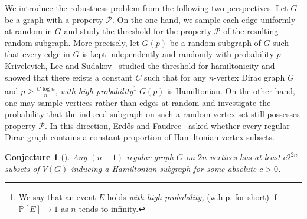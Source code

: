 \documentclass[11pt, a4paper]{article}
\newtheorem{conjecture}[theorem]{Conjecture}
\theoremstyle{definition}
\newcommand{\<}{\subseteq}
\begin{document}

We introduce the robustness problem from the following two perspectives. 
Let $G$ be a graph with a property $\mathcal{P}$.
On the one hand, we sample each edge uniformly at random in $G$ and study the threshold for the property $\mathcal{P}$ of the resulting random subgraph. 
{More precisely, let $G(p)$ be a random subgraph of $G$ such that every edge in $G$ is kept independently and randomly with probability $p$.} 
Krivelevich, Lee and Sudakov~\cite{Krivelevich2014} studied the threshold for hamiltonicity and showed that there exists a constant $C$ such that for any $n$-vertex Dirac graph $G$ and $p\ge \frac{C\log n}{n}$,  %
\textit{with high probability}\footnote{We say that an event $E$ holds \textit{with high probability,} (w.h.p. for short) if $\mathbb{P}[E]\rightarrow 1$ as $n$ tends to infinity.} $G(p)$ is Hamiltonian.
On the other hand, one may sample vertices rather than edges at random and investigate the probability that the induced subgraph on such a random vertex set still possesses property \(\mathcal{P}\). {In this direction, Erd\H{o}s and Faudree~\cite{Erdos1999} asked whether every regular Dirac graph contains a constant proportion of Hamiltonian vertex subsets.} 

\begin{conjecture}[\cite{Erdos1999}]\label{conj:Hamilton cycle}
Any $(n+1)$-regular graph $G$ on $2n$ vertices has at least $c2^{2n}$ subsets of $V(G)$ inducing a Hamiltonian subgraph for some absolute $c>0$.
\end{conjecture}
\end{document}
